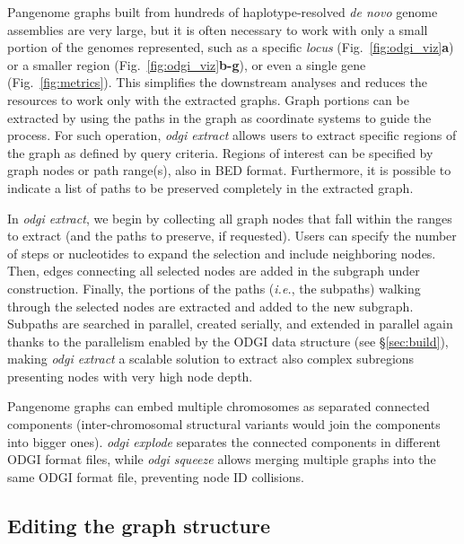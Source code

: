 \documentclass{bioinfo}
\begin{document}
Pangenome graphs built from hundreds of haplotype-resolved \textit{de novo} genome assemblies are very large, but it is often necessary to work with only a small portion of the genomes represented,
such as a specific \textit{locus} (Fig.~\ref{fig:odgi_viz}\textbf{a}) or a smaller region (Fig.~\ref{fig:odgi_viz}\textbf{b-g}), or even a single gene (Fig.~\ref{fig:metrics}).
This simplifies the downstream analyses and reduces the resources to work only with the extracted graphs.
Graph portions can be extracted by using the paths in the graph as coordinate systems to guide the process. For such operation, \textit{odgi extract} allows users to extract specific regions of the graph as defined by query criteria.
Regions of interest can be specified by graph nodes or path range(s), also in BED format. Furthermore, it is possible to indicate a list of paths to be preserved completely in the extracted graph.

In \textit{odgi extract}, we begin by collecting all graph nodes that fall within the ranges to extract (and the paths to preserve, if requested).
Users can specify the number of steps or nucleotides to expand the selection and include neighboring nodes.
Then, edges connecting all selected nodes are added in the subgraph under construction.
Finally, the portions of the paths (\textit{i.e.}, the subpaths) walking through the selected nodes are extracted and added to the new subgraph.
Subpaths are searched in parallel, created serially, and extended in parallel again thanks to the parallelism enabled by the ODGI data structure (see \S\ref{sec:build}), making \textit{odgi extract} a scalable solution to extract also complex subregions presenting nodes with very high node depth.


Pangenome graphs can embed multiple chromosomes as separated connected components (inter-chromosomal structural variants would join the components into bigger ones).
\textit{odgi explode} separates the connected components in different ODGI format files, while \textit{odgi squeeze} allows merging multiple graphs into the same ODGI format file, preventing node ID collisions.


\subsection{Editing the graph structure}
\label{sec:edit}
\end{document}
